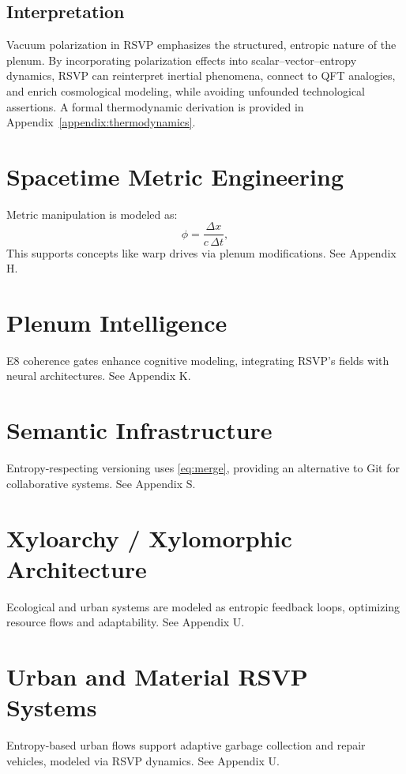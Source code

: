 \documentclass[12pt]{report}
\begin{document}
\section{Interpretation}

Vacuum polarization in RSVP emphasizes the structured, entropic nature of the plenum. By incorporating polarization effects into scalar--vector--entropy dynamics, RSVP can reinterpret inertial phenomena, connect to QFT analogies, and enrich cosmological modeling, while avoiding unfounded technological assertions. A formal thermodynamic derivation is provided in Appendix~\ref{appendix:thermodynamics}.

\chapter{Spacetime Metric Engineering}
Metric manipulation is modeled as:
\begin{equation}
\phi = \frac{\Delta x}{c \, \Delta t}, \label{eq:photon}
\end{equation}
This supports concepts like warp drives via plenum modifications. See Appendix H.

\chapter{Plenum Intelligence}
E8 coherence gates enhance cognitive modeling, integrating RSVP’s fields with neural architectures. See Appendix K.

\chapter{Semantic Infrastructure}
Entropy-respecting versioning uses \eqref{eq:merge}, providing an alternative to Git for collaborative systems. See Appendix S.

\chapter{Xyloarchy / Xylomorphic Architecture}
Ecological and urban systems are modeled as entropic feedback loops, optimizing resource flows and adaptability. See Appendix U.

\chapter{Urban and Material RSVP Systems}
Entropy-based urban flows support adaptive garbage collection and repair vehicles, modeled via RSVP dynamics. See Appendix U.
\end{document}
